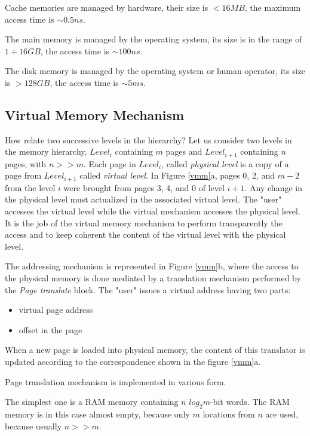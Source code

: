 Cache memories are managed by hardware, their size is $< 16MB$, the maximum access time is $\sim 0.5 ns$.

The main memory is managed by the operating system, its size is in the range of $1 \div 16 GB$, the access time is $\sim 100 ns$.

The disk memory is managed by the operating system or human operator, its size is $> 128GB$, the access time is $\sim 5 ms$.

\subsection{Virtual Memory Mechanism}

How relate two successive levels in the hierarchy? Let us consider two levels in the memory hierarchy, $Level_i$ containing $m$ pages and $Level_{i+1}$ containing $n$ pages, with $n >> m$. Each page in $Level_i$, called {\em physical level} is a copy of a page from $Level_{i+1}$ called {\em virtual level}. In Figure \ref{vmm}a, pages 0, 2, and $m-2$ from the level $i$ were brought from pages 3, 4, and 0 of level $i+1$. Any change in the physical level must actualized in the associated virtual level. The "user"  accesses the virtual level while the virtual mechanism accesses the physical level. It is the job of the virtual memory mechanism to perform transparently the access and to keep coherent the content of the virtual level with the physical level.



The addressing mechanism is represented in Figure \ref{vmm}b, where the access to the physical memory is done mediated by a translation mechanism performed by the {\em Page translate} block.  The "user" issues a virtual address having two parts:
\begin{itemize}
    \item virtual page address
    \item offset in the page
\end{itemize}
When a new page is loaded into physical memory, the content of this translator is updated according to the correspondence shown in the figure \ref{vmm}a.


Page translation mechanism is implemented in various form.

The simplest one is a RAM memory containing $n$ $log_2 m$-bit words. The RAM memory is in this case almost empty, because only $m$ locations from  $n$ are used, because usually $n>> m$.

